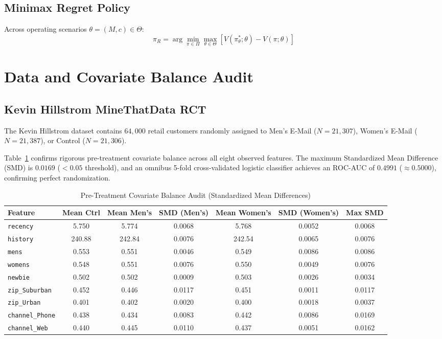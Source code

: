 \documentclass[11pt,a4paper]{article}
\begin{document}
\subsection{Minimax Regret Policy}
Across operating scenarios $\theta = (M, c) \in \Theta$:
\begin{equation}
\pi_R = \arg\min_{\pi \in \Pi} \max_{\theta \in \Theta} \left[ V(\pi^*_\theta; \theta) - V(\pi; \theta) \right]
\end{equation}

\section{Data and Covariate Balance Audit}

\subsection{Kevin Hillstrom MineThatData RCT}
The Kevin Hillstrom dataset \citep{hillstrom2008minethatdata} contains $64,000$ retail customers randomly assigned to Men's E-Mail ($N = 21,307$), Women's E-Mail ($N = 21,387$), or Control ($N = 21,306$). 

Table~\ref{tab:balance} confirms rigorous pre-treatment covariate balance across all eight observed features. The maximum Standardized Mean Difference (SMD) is $0.0169$ ($< 0.05$ threshold), and an omnibus 5-fold cross-validated logistic classifier achieves an ROC-AUC of $0.4991$ ($\approx 0.5000$), confirming perfect randomization.

\begin{table}[t]
\centering
\small
\caption{Pre-Treatment Covariate Balance Audit (Standardized Mean Differences)}
\label{tab:balance}
\begin{tabular}{lcccccc}
\toprule
Feature & Mean Ctrl & Mean Men's & SMD (Men's) & Mean Women's & SMD (Women's) & Max SMD \\
\midrule
\texttt{recency} & 5.750 & 5.774 & 0.0068 & 5.768 & 0.0052 & 0.0068 \\
\texttt{history} & 240.88 & 242.84 & 0.0076 & 242.54 & 0.0065 & 0.0076 \\
\texttt{mens} & 0.553 & 0.551 & 0.0046 & 0.549 & 0.0086 & 0.0086 \\
\texttt{womens} & 0.548 & 0.551 & 0.0076 & 0.550 & 0.0049 & 0.0076 \\
\texttt{newbie} & 0.502 & 0.502 & 0.0009 & 0.503 & 0.0026 & 0.0034 \\
\texttt{zip\_Suburban} & 0.452 & 0.446 & 0.0117 & 0.451 & 0.0011 & 0.0117 \\
\texttt{zip\_Urban} & 0.401 & 0.402 & 0.0020 & 0.400 & 0.0018 & 0.0037 \\
\texttt{channel\_Phone} & 0.438 & 0.434 & 0.0083 & 0.442 & 0.0086 & 0.0169 \\
\texttt{channel\_Web} & 0.440 & 0.445 & 0.0110 & 0.437 & 0.0051 & 0.0162 \\
\bottomrule
\end{tabular}
\end{table}
\end{document}
